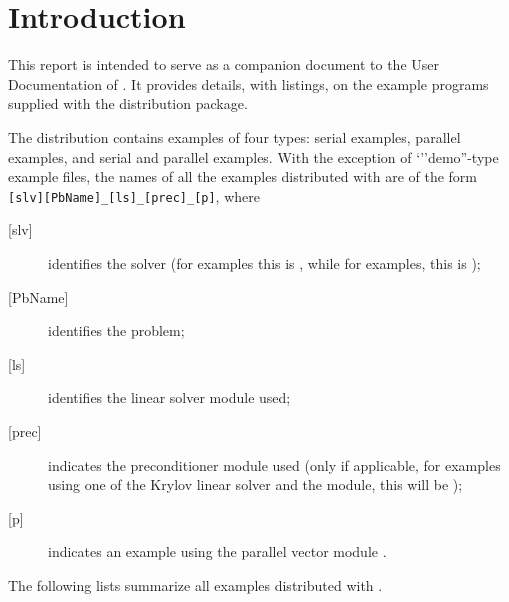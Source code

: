 \section{Introduction}\label{s:ex_intro}

This report is intended to serve as a companion document to the User
Documentation of {\ida} \cite{ida_ug}.  It provides details, with
listings, on the example programs supplied with the {\ida} distribution
package.

The {\ida} distribution contains examples of four types: serial
{\C} examples, parallel {\C} examples, and serial and parallel {\F}
examples.  
With the exception of `''demo''-type example files, the names of all the examples 
distributed with {\sundials} are of the form \verb![slv][PbName]_[ls]_[prec]_[p]!, 
where
\begin{description}
\item [{[slv]}] identifies the solver (for {\ida} examples this is , 
  while for {\fida} examples, this is );
\item [{[PbName]}] identifies the problem;
\item [{[ls]}] identifies the linear solver module used;
\item [{[prec]}] indicates the {\ida} preconditioner module used
  (only if applicable, for examples using one of the Krylov linear solver
  and the {\idabbdpre} module, this will be );
\item [{[p]}] indicates an example using the parallel vector module {\nvecp}.
\end{description}

\vspace{0.2in}\noindent
The following lists summarize all examples distributed with {\ida}.


